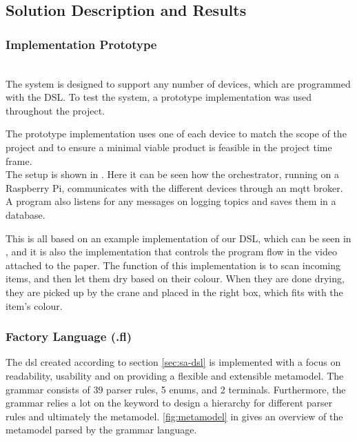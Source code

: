 \subsection{Solution Description and Results}

\subsubsection{Implementation Prototype}\hfill\\
The system is designed to support any number of devices, which are programmed with the DSL. To test the system, a prototype implementation was used throughout the project. 

The prototype implementation uses one of each device to match the scope of the project and to ensure a minimal viable product is feasible in the project time frame.
\\

The setup is shown in . Here it can be seen how the orchestrator, running on a Raspberry Pi, communicates with the different devices through an \acrshort{mqtt} broker. A program also listens for any messages on logging topics and saves them in a database.

This is all based on an example implementation of our DSL, which can be seen in , and it is also the implementation that controls the program flow in the video attached to the paper. The function of this implementation is to scan incoming items, and then let them dry based on their colour. When they are done drying, they are picked up by the crane and placed in the right box, which fits with the item's colour. 

\subsubsection{Factory Language (.fl)}\hfill

The \acrshort{dsl} created according to section \ref{sec:sa-dsl} is implemented with a focus on readability, usability and on providing a flexible and extensible metamodel. The grammar consists of 39 parser rules, 5 enums, and 2 terminals. Furthermore, the grammar relies a lot on the  keyword to design a hierarchy for different parser rules and ultimately the metamodel. \autoref{fig:metamodel} in  gives an overview of the metamodel parsed by the grammar language.\\

